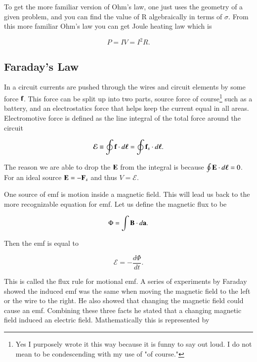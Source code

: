 \documentclass[preprint, review,12pt]{elsarticle}
\def\.{\cdot}
\def\b{\textbf}
\def\bell{\bm{\ell}}
\def\={\equiv}
\def\emf{\mathcal{E}}
\newcommand{\td}[2]{\frac{d #1 }{d #2}}
\begin{document}
To get the more familiar version of Ohm's law, one just uses the geometry of a given problem, and you can find the value of R algebraically in terms of $\sigma$. From this more familiar Ohm's law you can get Joule heating law which is

\begin{equation}
    P = IV = I^2R.
\end{equation}

\subsection{Faraday's Law}

In a circuit currents are pushed through the wires and circuit elements by some force $\b f$. This force can be split up into two parts, source force of course\footnote{Yes I purposely wrote it this way because it is funny to say out loud. I do not mean to be condescending with my use of "of course."} such as a battery, and an electrostatics force that helps keep the current equal in all areas. Electromotive force is defined as the line integral of the total force around the circuit

\begin{equation}
    \emf \= \oint \b f \. d\bell = \oint \b f_s \. d\bell.
\end{equation}

The reason we are able to drop the $\b E$ from the integral is because $\oint \b E \. d \bell = 0$. For an ideal source $\b E = - \b F_s$ and thus $V = \emf$.

One source of emf is motion inside a magnetic field. This will lead us back to the more recognizable equation for emf. Let us define the magnetic flux to be

\begin{equation}
    \Phi = \int \b B \. d\b a.
\end{equation}

Then the emf is equal to 

\begin{equation}
    \emf = - \td{\Phi}{t}.
\end{equation}

This is called the flux rule for motional emf. A series of experiments by Faraday showed the induced emf was the same when moving the magnetic field to the left or the wire to the right. He also showed that changing the magnetic field could cause an emf. Combining these three facts he stated that a changing magnetic field induced an electric field. Mathematically this is represented by
\end{document}
